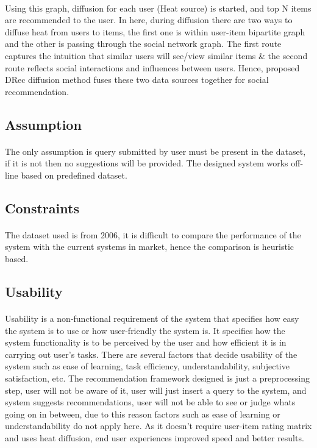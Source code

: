 \paragraph{}Using this graph, diffusion for each user (Heat source) is started, and top N items are recommended to the user. In here, during diffusion there are two ways to diffuse heat from users to items, the first one is within user-item bipartite graph and the other is passing through the social network graph. The first route captures the intuition that similar users will see/view similar items \& the second route reflects social interactions and influences between users. Hence, proposed DRec diffusion method fuses these two data sources together for social recommendation.

\subsection{Assumption}
\paragraph{}The only assumption is query submitted by user must be present in the dataset, if it is not then no suggestions will be provided. The designed system works off-line based on predefined dataset.

\subsection{Constraints}
\paragraph{}The dataset used is from 2006, it is difficult to compare the performance of the system with the current systems in market, hence the comparison is heuristic based.

\subsection{Usability}
\paragraph{}Usability is a non-functional requirement of the system that specifies how easy the system is to use or how user-friendly the system is. It specifies how the system functionality is to be perceived by the user and how efficient it is in carrying out user’s tasks. There are several factors that decide usability of the system such as ease of learning, task efficiency, understandability, subjective satisfaction, etc. The recommendation framework designed is just a preprocessing step, user will not be aware of it, user will just insert a query to the system, and system suggests recommendations, user will not be able to see or judge whats going on in between, due to this reason factors such as ease of learning or understandability do not apply here. As it doesn't require user-item rating matrix and uses heat diffusion, end user  experiences improved speed and better results.